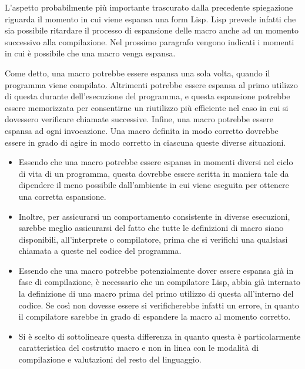 L’aspetto probabilmente più importante trascurato dalla precedente spiegazione
riguarda il momento in cui viene espansa una form Lisp. Lisp prevede infatti
che sia possibile ritardare il processo di espansione delle macro anche ad un
momento successivo alla compilazione. Nel prossimo paragrafo vengono indicati
i momenti in cui è possibile che una macro venga espansa.

Come detto, una macro potrebbe essere espansa una sola volta, quando il
programma viene compilato. Altrimenti potrebbe essere espansa al primo
utilizzo di questa durante dell’esecuzione del programma, e questa espansione
potrebbe essere memorizzata per consentirne un riutilizzo più efficiente nel
caso in cui si dovessero verificare chiamate successive. Infine, una macro
potrebbe essere espansa ad ogni invocazione. Una macro definita in modo
corretto dovrebbe essere in grado di agire in modo corretto in ciascuna queste
diverse situazioni.

\begin{itemize}

\item Essendo che una macro potrebbe essere espansa in momenti diversi nel
ciclo di vita di un programma, questa dovrebbe essere scritta in maniera tale
da dipendere il meno possibile dall’ambiente in cui viene eseguita per
ottenere una corretta espansione.

\item Inoltre, per assicurarsi un comportamento consistente in diverse
esecuzioni, sarebbe meglio assicurarsi del fatto che tutte le definizioni di
macro siano disponibili, all’interprete o compilatore, prima che si verifichi
una qualsiasi chiamata a queste nel codice del programma.

\item Essendo che una macro potrebbe potenzialmente dover essere espansa già
in fase di compilazione, è necessario che un compilatore Lisp, abbia già
internato la definizione di una macro prima del primo utilizzo di questa
all’interno del codice. Se così non dovesse essere si verificherebbe infatti
un errore, in quanto il compilatore sarebbe in grado di espandere la macro al
momento corretto.

\item Si è scelto di sottolineare questa differenza in quanto questa è
particolarmente caratteristica del costrutto macro e non in linea con le
modalità di compilazione e valutazioni del resto del linguaggio.

\end{itemize}

